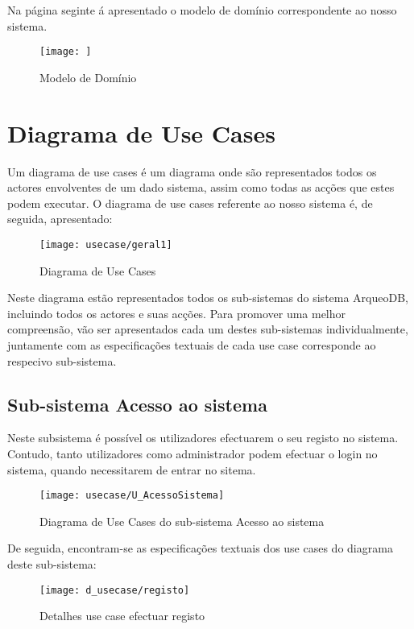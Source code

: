 \documentclass[12pt,a4paper]{article}
\begin{document}
Na página seginte á apresentado o modelo de domínio correspondente ao nosso sistema.
\newpage

\begin{figure}[h!]
\centering
\texttt{[image: ]}
\label{modelo domínio}
\caption{Modelo de Domínio}
\end{figure}


\newpage
\section{Diagrama de Use Cases}
Um diagrama de use cases é um diagrama onde são representados todos os actores envolventes de um dado sistema, assim como todas as acções que estes podem executar. O diagrama de use cases referente ao nosso sistema é, de seguida, apresentado:\\

\begin{figure}[h!]
\centering
\texttt{[image: usecase/geral1]}
\label{usecase}
\caption{Diagrama de Use Cases}
\end{figure}

Neste diagrama estão representados todos os sub-sistemas do sistema ArqueoDB, incluindo todos os actores e suas acções. Para promover uma  melhor compreensão, vão ser apresentados cada um destes sub-sistemas individualmente, juntamente com as especificações textuais de cada use case corresponde ao respecivo sub-sistema. \\

\newpage
\subsection{Sub-sistema Acesso ao sistema}
Neste subsistema é possível os utilizadores efectuarem o seu registo no sistema. Contudo, tanto utilizadores como administrador podem efectuar o login no sistema, quando necessitarem de entrar no sitema.\\

\begin{figure}[h!]
\centering
\texttt{[image: usecase/U\_AcessoSistema]}
\label{usecase}
\caption{Diagrama de Use Cases do sub-sistema Acesso ao sistema}
\end{figure}

De seguida, encontram-se as especificações textuais dos use cases do diagrama deste sub-sistema:\\

\begin{figure}[h!]
\centering
\texttt{[image: d\_usecase/registo]}
\label{usecase}
\caption{Detalhes use case efectuar registo}
\end{figure}
\end{document}

